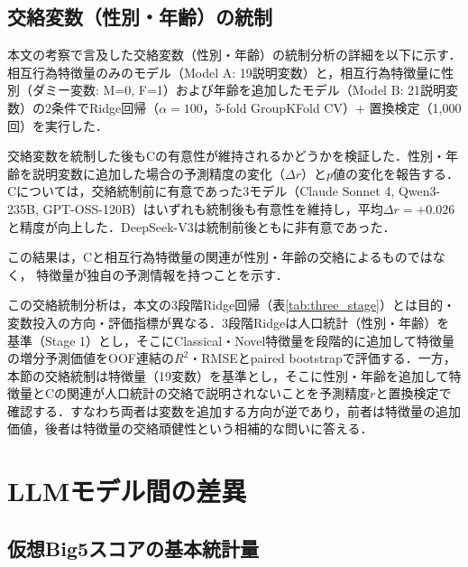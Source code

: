 \documentclass[dvipdfmx,11pt,a4paper]{bxjsarticle}
\renewcommand{\_}{\paperorigunderscore\allowbreak}%
\begin{document}
\begin{table}[htbp]
\centering
\caption{正則化パラメータ$\alpha$に対する感度（Big5次元C，4モデル平均，
5-fold CV，置換検定5,000回）．$^{\dagger}$は本文で採用した$\alpha = 100$を表す．
$\alpha = 100$の$r_{\text{obs}} = 0.4315$は本文の3桁表記$0.432$に対応する．}
\label{tab:sensitivity_alpha}

\end{table}

\subsection{交絡変数（性別・年齢）の統制}
\label{sec:appendix_confound}

本文の考察で言及した交絡変数（性別・年齢）の統制分析の詳細を以下に示す．相互行為特徴量のみのモデル（Model A: 19説明変数）と，相互行為特徴量に性別（ダミー変数: M=0, F=1）および年齢を追加したモデル（Model B: 21説明変数）の2条件でRidge回帰（$\alpha = 100$，5-fold GroupKFold CV）+ 置換検定（1,000回）を実行した．

交絡変数を統制した後もCの有意性が維持されるかどうかを検証した．性別・年齢を説明変数に追加した場合の予測精度の変化（$\Delta r$）と$p$値の変化を報告する．Cについては，交絡統制前に有意であった3モデル（Claude Sonnet 4, Qwen3-235B, GPT-OSS-120B）はいずれも統制後も有意性を維持し，平均$\Delta r = +0.026$と精度が向上した．DeepSeek-V3は統制前後ともに非有意であった．

この結果は，Cと相互行為特徴量の関連が性別・年齢の交絡によるものではなく，
特徴量が独自の予測情報を持つことを示す．

この交絡統制分析は，本文の3段階Ridge回帰（表\ref{tab:three_stage}）とは目的・変数投入の方向・評価指標が異なる．3段階Ridgeは人口統計（性別・年齢）を基準（Stage 1）とし，そこにClassical・Novel特徴量を段階的に追加して特徴量の増分予測価値をOOF連結の$R^2$・RMSEとpaired bootstrapで評価する．一方，本節の交絡統制は特徴量（19変数）を基準とし，そこに性別・年齢を追加して特徴量とCの関連が人口統計の交絡で説明されないことを予測精度$r$と置換検定で確認する．すなわち両者は変数を追加する方向が逆であり，前者は特徴量の追加価値，後者は特徴量の交絡頑健性という相補的な問いに答える．


\section{LLMモデル間の差異}
\label{sec:appendix_llm}

\subsection{仮想Big5スコアの基本統計量}
\label{sec:appendix_score_stats}
\end{document}
